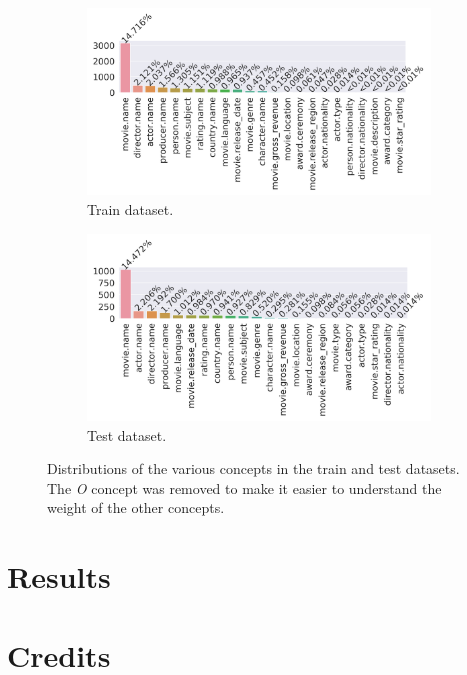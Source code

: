 \documentclass[11pt,a4paper]{article}
\begin{document}
\begin{figure}[h!]
	\begin{subfigure}[b]{0.5\linewidth}
		\includegraphics[width=\linewidth]{img/train-concepts-distribution}
		\caption{Train dataset.}
	\end{subfigure}
	\begin{subfigure}[b]{0.5\linewidth}
	\includegraphics[width=\textwidth]{img/test-concepts-distribution}
	\caption{Test dataset.}
	\end{subfigure}
	\label{fig:concept-distribution}
	\caption{Distributions of the various concepts in the train and test datasets. The \textit{O} concept was removed to make it easier to understand the weight of the other concepts.}
\end{figure}

\section{Results}

\section{Credits}
\end{document}
